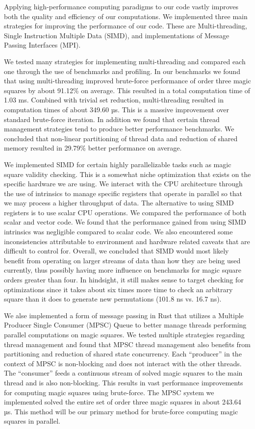 \documentclass{rhumj_new}
\begin{document}
Applying high-performance computing paradigms to our code vastly improves both the quality and
efficiency of our computations. We implemented three main strategies for improving the performance
of our code. These are Multi-threading, Single Instruction Multiple Data (SIMD), and
implementations of Message Passing Interfaces (MPI).

We tested many strategies for implementing multi-threading and compared each one through the
use of benchmarks and profiling. In our benchmarks we found that using multi-threading improved
brute-force performance of order three magic squares by about 91.12\% on average. This resulted in
a total computation time of 1.03 ms. Combined with trivial set reduction, multi-threading resulted
in computation times of about 349.60 µs. This is a massive improvement over standard brute-force
iteration. In addition we found that certain thread management strategies tend to produce better
performance benchmarks. We concluded that non-linear partitioning of thread data and reduction of
shared memory resulted in 29.79\% better performance on average.

We implemented SIMD for certain highly parallelizable tasks such as magic square validity
checking. This is a somewhat niche optimization that exists on the specific hardware we are using.
We interact with the CPU architecture through the use of intrinsics to manage specific registers
that operate in parallel so that we may process a higher throughput of data. The alternative to
using SIMD registers is to use scalar CPU operations. We compared the performance of both scalar
and vector code. We found that the performance gained from using SIMD intrinsics was negligible
compared to scalar code. We also encountered some inconsistencies attributable to environment and
hardware related caveats that are difficult to control for. Overall, we concluded that SIMD would
most likely benefit from operating on larger streams of data than how they are being used
currently, thus possibly having more influence on benchmarks for magic square orders greater than
four. In hindsight, it still makes sense to target checking for optimizations since it takes about
six times more time to check an arbitrary square than it does to generate new permutations (101.8
ns vs. 16.7 ns).

We alse implemented a form of message passing in Rust that utilizes a Multiple Producer Single
Consumer (MPSC) Queue to better manage threads performing parallel computations on magic squares.
We tested multiple strategies regarding thread management and found that MPSC thread management
also benefits from partitioning and reduction of shared state concurrency. Each ``producer'' in the
context of MPSC is non-blocking and does not interact with the other threads. The ``consumer''
feeds a continuous stream of solved magic squares to the main thread and is also non-blocking. This
results in vast performance improvements for computing magic squares using brute-force. The MPSC
system we implemented solved the entire set of order three magic squares in about 243.64 µs. This
method will be our primary method for brute-force computing magic squares in parallel.
\end{document}
